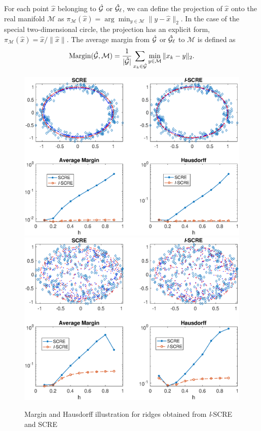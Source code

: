 \documentclass[aos,preprint]{imsart}
\theoremstyle{remark}
\begin{document}
For each point $\hat{x}$ belonging to ${\cal \hat{G}}$ or ${\cal \hat{G}}_\ell$, we can define the projection of $\hat{x}$ onto the real manifold $\mathcal M$ as $\pi_{\mathcal M}(\hat{x}) = \arg\min_{y\in \mathcal M} \|y-\hat{x}\|_2$. In the case of the special two-dimensional circle, the projection has an explicit form, $\pi_{\mathcal M}(\hat{x}) = \hat{x}/\|\hat{x}\|$. The average margin from $\cal \hat{G}$ or ${ \cal \hat{G}}_\ell$ to $\mathcal M$ is defined as
\[
{\rm Margin}({ \cal \hat{G}, \mathcal M}) =\frac{1}{|{\cal \hat{G}}|}  \sum_{x_k\in  {\cal \hat{G}}} \min_{y\in \mathcal M}\|x_k-y\|_2.
\]
\begin{figure}[t] %
   \includegraphics[width=\linewidth]{circle8n.eps} 
   \includegraphics[width=\linewidth]{sphere8.eps} 
   \vspace{-1cm}
   \caption{Margin and Hausdorff illustration for ridges obtained from {\it l}-SCRE and SCRE}
   \label{fig:circle6}
\end{figure}
\end{document}
